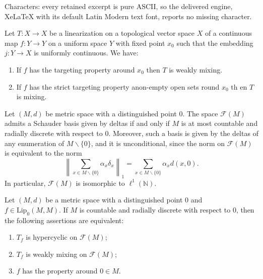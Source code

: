 \documentclass[10pt,a4paper]{amsart}
\def\NN{\mathbb N}
\def\aa{\alpha}
\def\aim{\text{targeting}{}}
\newcommand{\free}[1]{\mathcal{F}(#1)}
\begin{document}
Characters: every retained excerpt is pure ASCII, so the delivered engine, XeLaTeX with its default Latin Modern text font, reports no missing character.
\begin{theorem}  \label{thm:aim-WHC}
Let $T\colon X\to X$ be a linearization on a topological vector space $X$ of a continuous map $f\colon Y\to Y$ on a uniform space $Y$ with fixed point $x_0$ such that the embedding $j\colon Y\to X$ is uniformly continuous. We have: 
\begin{enumerate}
    \item If $f$ has the targeting property around $x_0$ then $T$ is weakly mixing.
    \item If $f$ has the strict targeting property anon-empty open sets round $x_0$ th en $T$ is mixing.
\end{enumerate}
\end{theorem}

\begin{corollary}\label{cor:delta-basis}
Let $(M,d)$ be metric space with a distinguished point $0$. The space $\mathcal{F}(M)$ admits a Schauder basis given by deltas if and only if $M$ is at most countable and radially discrete with respect to $0$.
Moreover, such a basis is given by the deltas of any  enumeration of $M\backslash\{0\}$, and it is unconditional, since the norm on $\mathcal{F}(M)$ is equivalent to the norm 
\[\left\|\sum_{x\in M\backslash\{0\}}\aa_x \delta_{x}\right\|_1=\sum_{x\in M\backslash\{0\}}\aa_x d(x,0).\]
In particular, $\free{M}$ is isomorphic to $\ell^1(\NN)$.
\end{corollary}

\begin{theorem}\label{hypdeltas}
Let $(M,d)$ be a metric space with a distinguished point $0$ and $f\in \text{Lip}_0(M,M)$. If $M$ is countable and radially discrete with respect to $0$, then the following assertions are equivalent:
\begin{enumerate}
\item $T_f$ is hypercyclic on $\free{M}$;
\item $T_f$ is weakly mixing on $\free{M}$;
\item $f$ has the \aim{} property around $0\in M$.
\end{enumerate}
\end{theorem}
\end{document}
